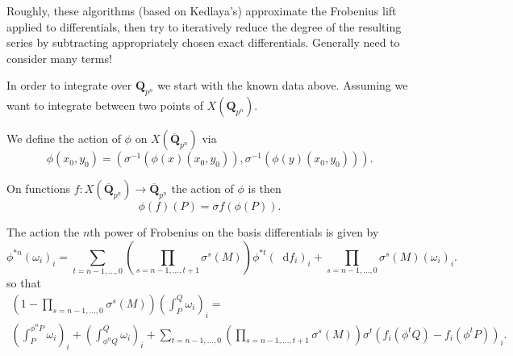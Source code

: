 \documentclass[oneside,11pt,]{article}
\newcommand{\diff}{\mathop{}\!\mathrm{d}}
\newcommand{\inv}{^{-1}}
\newcommand{\QQ}{\mathbf{Q}}
\let\emph\relax %
\begin{document}
Roughly, these algorithms (based on Kedlaya's) approximate the Frobenius lift applied to differentials, then try to iteratively reduce the degree of the resulting series by subtracting appropriately chosen exact differentials.
Generally need to consider many terms!

\emph{Over extension fields:}
In order to integrate over $\QQ_{p^n}$ we start with the known data above.
Assuming we want to integrate between two points of $X(\QQ_{p^n})$.

We define the action of \(\phi \) on \(X(\overline {\QQ}_{p^n})\) via%
\begin{equation*}
\phi (x_0, y_0) = (\sigma \inv (\phi (x) (x_0, y_0)), \sigma \inv (\phi (y)(x_0,y_0)))\text{.}\label{x:men:eqn-pt-act}
\end{equation*}
%
\par
On functions \(f\colon X(\overline{\QQ}_{p^n}) \to \overline{\QQ}_{p^n}\) the action of \(\phi \) is then%
\begin{equation*}
\phi (f)(P) = \sigma f(\phi (P))\text{.}\label{x:men:eqn-fun-act}
\end{equation*}

The action the \(n\)th power of Frobenius on the basis differentials is given by%
\begin{equation*}
\phi ^{*n} (\omega_i)_i  = \sum_{t = n-1,\ldots, 0} \left(\prod_{s=n-1, \ldots, t+1} \sigma^s(M)\right)\phi ^{*t}(\diff f_i)_i + \prod_{s = n-1, \ldots, 0}\sigma ^s(M) (\omega _i)_i\text{.}\label{x:men:eqn-nth-power-frob-act}
\end{equation*}
so that
\begin{gather*}
\left(1 - \prod_{s = n-1, \ldots, 0}\sigma ^s(M)\right) \left(\int_{P}^{Q}\omega _i \right)_i = \label{g:mrow:idm445039011104}\\
\left(\int_P^{\phi ^{n}P} \omega _i\right)_i+ \left(\int_{\phi ^{n} Q}^Q \omega _i\right)_i         + \sum_{t = n-1,\ldots, 0} \left(\prod_{s=n-1, \ldots, t+1} \sigma^s(M)\right)\sigma^t\left(f_i(\phi ^t Q) - f_i(\phi ^t P)\right)_i\text{.}\label{x:mrow:eqn-final-linear}
\end{gather*}
\par
\end{document}
